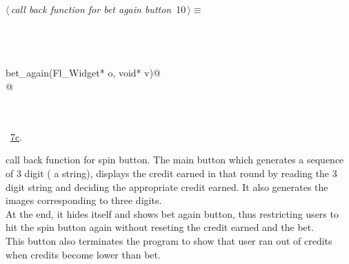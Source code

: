 \documentclass{article}
\renewcommand{\NWtarget}[2]{\hypertarget{#1}{#2}}
\renewcommand{\NWlink}[2]{\hyperlink{#1}{#2}}
\begin{document}
\begin{flushleft} \small
\begin{minipage}{\linewidth}\label{scrap15}\raggedright\small
\NWtarget{nuweb10}{} $\langle\,${\it call back function for bet again button}\nobreak\ {\footnotesize {10}}$\,\rangle\equiv$
\vspace{-1ex}
\begin{list}{}{} \item
\mbox{}\verb@@\\
\mbox{}\verb@@\\
\mbox{}\verb@@\\
\mbox{}\verb@void bet_again(Fl_Widget* o, void* v)@\\
\mbox{}@\\
\mbox{}\verb@@\\
\mbox{}\verb@@\\
\mbox{}\verb@@{\NWsep}
\end{list}
\vspace{-1.5ex}
\footnotesize
\begin{list}{}{\setlength{\itemsep}{-\parsep}\setlength{\itemindent}{-\leftmargin}}
\item \NWtxtMacroRefIn\ \NWlink{nuweb7c}{7c}.

\item{}
\end{list}
\end{minipage}\vspace{4ex}
\end{flushleft}
call back function for spin button. The main button which generates a sequence of 3 digit ( a string), displays the credit earned in that round by reading the 3 digit string and deciding the appropriate credit earned. It also generates the images corresponding to three digits. \\ At the end, it hides itself and shows bet again button, thus restricting users to hit the spin button again without reseting the credit earned and the bet.\\ This button also terminates the program to show that user ran out of credits when credits become lower than bet.
\end{document}
